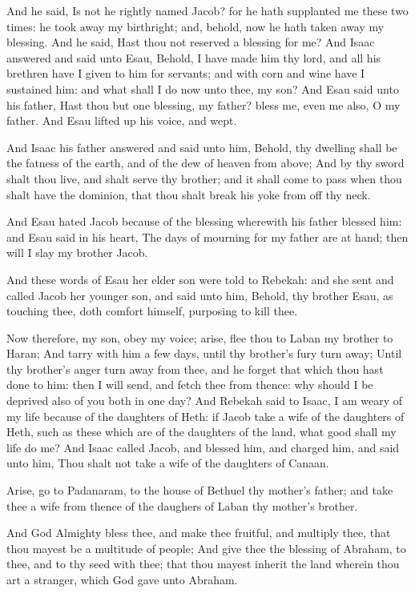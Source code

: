 \Verse And he said, Is not he rightly named Jacob? for he hath supplanted me these two times: he took away my birthright; and, behold, now he hath taken away my blessing. And he said, Hast thou not reserved a blessing for me?  \Verse And Isaac answered and said unto Esau, Behold, I have made him thy lord, and all his brethren have I given to him for servants; and with corn and wine have I sustained him: and what shall I do now unto thee, my son?  \Verse And Esau said unto his father, Hast thou but one blessing, my father? bless me, even me also, O my father. And Esau lifted up his voice, and wept.

\Verse And Isaac his father answered and said unto him, Behold, thy dwelling shall be the fatness of the earth, and of the dew of heaven from above; \Verse And by thy sword shalt thou live, and shalt serve thy brother; and it shall come to pass when thou shalt have the dominion, that thou shalt break his yoke from off thy neck.

\Verse And Esau hated Jacob because of the blessing wherewith his father blessed him: and Esau said in his heart, The days of mourning for my father are at hand; then will I slay my brother Jacob.

\Verse And these words of Esau her elder son were told to Rebekah: and she sent and called Jacob her younger son, and said unto him, Behold, thy brother Esau, as touching thee, doth comfort himself, purposing to kill thee.

\Verse Now therefore, my son, obey my voice; arise, flee thou to Laban my brother to Haran; \Verse And tarry with him a few days, until thy brother's fury turn away; \Verse Until thy brother's anger turn away from thee, and he forget that which thou hast done to him: then I will send, and fetch thee from thence: why should I be deprived also of you both in one day?  \Verse And Rebekah said to Isaac, I am weary of my life because of the daughters of Heth: if Jacob take a wife of the daughters of Heth, such as these which are of the daughters of the land, what good shall my life do me?  \Chapter \Verse And Isaac called Jacob, and blessed him, and charged him, and said unto him, Thou shalt not take a wife of the daughters of Canaan.

\Verse Arise, go to Padanaram, to the house of Bethuel thy mother's father; and take thee a wife from thence of the daughers of Laban thy mother's brother.

\Verse And God Almighty bless thee, and make thee fruitful, and multiply thee, that thou mayest be a multitude of people; \Verse And give thee the blessing of Abraham, to thee, and to thy seed with thee; that thou mayest inherit the land wherein thou art a stranger, which God gave unto Abraham.

